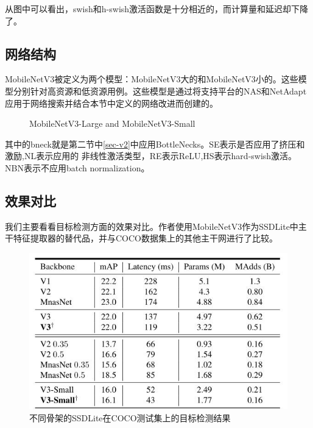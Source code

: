 \documentclass[UTF8,a4paper,12pt]{ctexart}
\begin{document}
从图中可以看出，swish和h-swish激活函数是十分相近的，而计算量和延迟却下降了。


\subsection{网络结构}
MobileNetV3被定义为两个模型：MobileNetV3大的和MobileNetV3小的。这些模型分别针对高资源和低资源用例。这些模型是通过将支持平台的NAS\cite{MnasNet}和NetAdapt\cite{NetAdapt}应用于网络搜索并结合本节中定义的网络改进而创建的。

\begin{figure}[htpb]
	\centering
	\label{fig-MobileNetV3-Large and MobileNetV3-Small}
	\caption{MobileNetV3-Large and MobileNetV3-Small}
\end{figure}

其中的bneck就是第二节中\ref{sec-v2}中应用BottleNecks。SE表示是否应用了挤压和激励\cite{MnasNet},NL表示应用的
非线性激活类型，RE表示ReLU,HS表示hard-swish激活。NBN表示不应用batch normalization。

\subsection{效果对比}
我们主要看看目标检测方面的效果对比。作者使用MobileNetV3作为SSDLite\cite{MOBV2}中主干特征提取器的替代品，并与COCO数据集上的其他主干网进行了比较\cite{COCO}。
\begin{figure}[htbp]
	\centering
	\includegraphics[width=0.7\linewidth]{webmin/v3结果比较.jpg}
	\caption{不同骨架的SSDLite在COCO测试集上的目标检测结果}
	\label{fig-v3jieguobijiao}
\end{figure}
\end{document}
